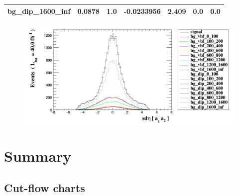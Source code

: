 \documentclass[a4paper, 10pt]{article}
\begin{document}
\begin{table}[H]
\begin{center}
\begin{tabular}{|m{23.0mm}|m{23.0mm}|m{18.0mm}|m{19.0mm}|m{19.0mm}|m{19.0mm}|m{19.0mm}|}
      \hline
      {\cellcolor{white}         bg\_dip\_1600\_inf}& {\cellcolor{white}         0.0878}& {\cellcolor{white}         1.0}& {\cellcolor{white}         -0.0233956}& {\cellcolor{white}         2.409}& {\cellcolor{green}         0.0}& {\cellcolor{green}         0.0}\\
\hline
    \end{tabular}
  \end{center}
\end{table}

\begin{figure}[H]
  \begin{center}
    \includegraphics[scale=0.45]{selection_16.png}\\
\caption{   }
  \end{center}
\end{figure}
\newpage
\section{ Summary}

\subsection{Cut-flow charts}
\end{document}
